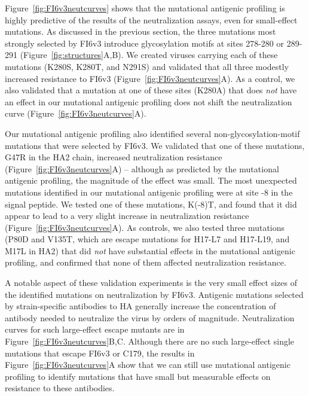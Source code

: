 \documentclass[11pt]{article}
\begin{document}
Figure~\ref{fig:FI6v3neutcurves} shows that the mutational antigenic profiling is highly predictive of the results of the neutralization assays, even for small-effect mutations.
As discussed in the previous section, the three mutations most strongly selected by FI6v3 introduce glycosylation motifs at sites 278-280 or 289-291 (Figure~\ref{fig:structures}A,B).
We created viruses carrying each of these mutations (K280S, K280T, and N291S) and validated that all three modestly increased resistance to FI6v3 (Figure~\ref{fig:FI6v3neutcurves}A).
As a control, we also validated that a mutation at one of these sites (K280A) that does \emph{not} have an effect in our mutational antigenic profiling does not shift the neutralization curve (Figure~\ref{fig:FI6v3neutcurves}A).

Our mutational antigenic profiling also identified several non-glycosylation-motif mutations that were selected by FI6v3.
We validated that one of these mutations, G47R in the HA2 chain, increased neutralization resistance (Figure~\ref{fig:FI6v3neutcurves}A) -- although as predicted by the mutational antigenic profiling, the magnitude of the effect was small.
The most unexpected mutations identified in our mutational antigenic profiling were at site -8 in the signal peptide.
We tested one of these mutations, K(-8)T, and found that it did appear to lead to a very slight increase in neutralization resistance (Figure~\ref{fig:FI6v3neutcurves}A).
As controls, we also tested three mutations (P80D and V135T, which are escape mutations for H17-L7 and H17-L19, and M17L in HA2) that did \emph{not} have substantial effects in the mutational antigenic profiling, and confirmed that none of them affected neutralization resistance.

A notable aspect of these validation experiments is the very small effect sizes of the identified mutations on neutralization by FI6v3.
Antigenic mutations selected by strain-specific antibodies to HA generally increase the concentration of antibody needed to neutralize the virus by orders of magnitude.
Neutralization curves for such large-effect escape mutants are in Figure~\ref{fig:FI6v3neutcurves}B,C.
Although there are no such large-effect single mutations that escape FI6v3 or C179, the results in Figure~\ref{fig:FI6v3neutcurves}A show that we can still use mutational antigenic profiling to identify mutations that have small but measurable effects on resistance to these antibodies.
\end{document}
